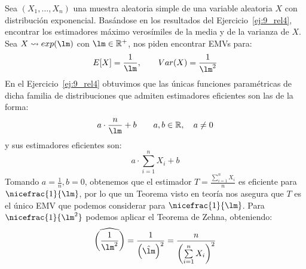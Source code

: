 \begin{ejercicio}
    Sea $(X_1, \ldots, X_n)$ una muestra aleatoria simple de una variable aleatoria $X$ con distribución exponencial. Basándose en los resultados del Ejercicio~\ref{ej:9_rel4}, encontrar los estimadores máximo verosímiles de la media y de la varianza de $X$.\\

    \noindent
    Sea $X\rightsquigarrow exp(\lm)$ con $\lm\in \mathbb{R}^+$, nos piden encontrar EMVs para:
    \begin{equation*}
        E[X] = \frac{1}{\lm}, \qquad Var(X) = \frac{1}{\lm^2}
    \end{equation*}
    En el Ejercicio~\ref{ej:9_rel4} obtuvimos que las únicas funciones paramétricas de dicha familia de distribuciones que admiten estimadores eficientes son las de la forma:
    \begin{equation*}
        a\cdot \frac{n}{\lm} +b \qquad a,b\in \mathbb{R}, \quad a\neq 0
    \end{equation*}
    y sus estimadores eficientes son:
    \begin{equation*}
        a\cdot \sum_{i=1}^{n}X_i + b
    \end{equation*}
    Tomando $a=\frac{1}{n}, b=0$, obtenemos que el estimador $T=\frac{\sum\limits_{i=1}^nX_i}{n}$ es eficiente para $\nicefrac{1}{\lm}$, por lo que un Teorema visto en teoría nos asegura que $T$ es el único EMV que podemos considerar para $\nicefrac{1}{\lm}$. Para $\nicefrac{1}{\lm^2}$ podemos aplicar el Teorema de Zehna, obteniendo:
    \begin{equation*}
        \widehat{{\left(\frac{1}{\lm^2}\right)}} = \frac{1}{{\left(\hat{\lm}\right)}^{2}} = \frac{n}{{\left(\sum\limits_{i=1}^{n}X_i\right)}^{2}}
    \end{equation*}
\end{ejercicio}

